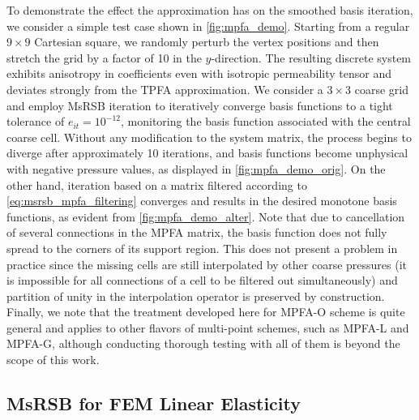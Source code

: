 To demonstrate the effect the approximation has on the smoothed basis iteration, we consider a simple test case shown in \cref{fig:mpfa_demo}.   Starting from a regular $9 \times 9$ Cartesian square, we randomly perturb the vertex positions and then stretch the grid by a factor of 10 in the $y$-direction.   The resulting discrete system exhibits anisotropy in coefficients even with isotropic permeability tensor and deviates strongly from the TPFA approximation.   We consider a $3 \times 3$ coarse grid and employ MsRSB iteration to iteratively converge basis functions to a tight tolerance of $e_{it} = 10^{-12}$, monitoring the basis function associated with the central coarse cell.   Without any modification to the system matrix, the process begins to diverge after approximately 10 iterations, and basis functions become unphysical with negative pressure values, as displayed in \cref{fig:mpfa_demo_orig}.   On the other hand, iteration based on a matrix filtered according to \cref{eq:msrsb_mpfa_filtering} converges and results in the desired monotone basis functions, as evident from \cref{fig:mpfa_demo_alter}.   Note that due to cancellation of several connections in the MPFA matrix, the basis function does not fully spread to the corners of its support region.   This does not present a problem in practice since the missing cells are still interpolated by other coarse pressures (it is impossible for all connections of a cell to be filtered out simultaneously) and partition of unity in the interpolation operator is preserved by construction.   Finally, we note that the treatment developed here for MPFA-O scheme is quite general and applies to other flavors of multi-point schemes, such as MPFA-L and MPFA-G, although conducting thorough testing with all of them is beyond the scope of this work.

\subsection{MsRSB for FEM Linear Elasticity}
\label{subsec:enhanced_msrsb_mech}

